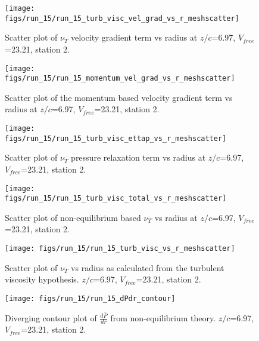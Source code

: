 \begin{figure}[H]
\centering
\texttt{[image: figs/run\_15/run\_15\_turb\_visc\_vel\_grad\_vs\_r\_meshscatter]}
\caption{Scatter plot of $\nu_T$ velocity gradient term vs radius at $z/c$=6.97, $V_{free}$=23.21, station 2.}
\end{figure}


\begin{figure}[H]
\centering
\texttt{[image: figs/run\_15/run\_15\_momentum\_vel\_grad\_vs\_r\_meshscatter]}
\caption{Scatter plot of the momentum based velocity gradient term vs radius at $z/c$=6.97, $V_{free}$=23.21, station 2.}
\end{figure}


\begin{figure}[H]
\centering
\texttt{[image: figs/run\_15/run\_15\_turb\_visc\_ettap\_vs\_r\_meshscatter]}
\caption{Scatter plot of $\nu_T$ pressure relaxation term vs radius at $z/c$=6.97, $V_{free}$=23.21, station 2.}
\end{figure}


\begin{figure}[H]
\centering
\texttt{[image: figs/run\_15/run\_15\_turb\_visc\_total\_vs\_r\_meshscatter]}
\caption{Scatter plot of non-equilibrium based $\nu_T$ vs radius at $z/c$=6.97, $V_{free}$=23.21, station 2.}
\end{figure}


\begin{figure}[H]
\centering
\texttt{[image: figs/run\_15/run\_15\_turb\_visc\_vs\_r\_meshscatter]}
\caption{Scatter plot of $\nu_T$ vs radius as calculated from the turbulent viscosity hypothesis. $z/c$=6.97, $V_{free}$=23.21, station 2.}
\end{figure}


\begin{figure}[H]
\centering
\texttt{[image: figs/run\_15/run\_15\_dPdr\_contour]}
\caption{Diverging contour plot of $\frac{d\bar{P}}{dr}$ from non-equilibrium theory. $z/c$=6.97, $V_{free}$=23.21, station 2.}
\end{figure}


